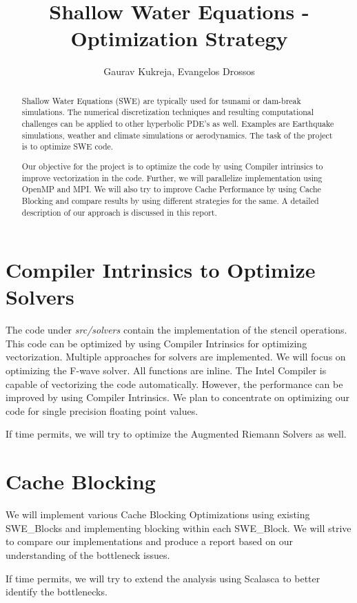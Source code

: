 \documentclass[]{article}
\title{Shallow Water Equations - Optimization Strategy}
\author{Gaurav Kukreja, Evangelos Drossos}
\begin{document}
\maketitle

\begin{abstract}
Shallow Water Equations (SWE) are typically used for tsunami or dam-break simulations.
The numerical discretization techniques and resulting computational challenges can be
applied to other hyperbolic PDE's as well. Examples are Earthquake simulations,
weather and climate simulations or aerodynamics. The task of the project is to optimize
SWE code. 

Our objective for the project is to optimize the code by using Compiler intrinsics to
improve vectorization in the code. Further, we will parallelize implementation using
OpenMP and MPI. We will also try to improve Cache Performance by using Cache Blocking
and compare results by using different strategies for the same. A detailed description of
our approach is discussed in this report.
\end{abstract}

\section{Compiler Intrinsics to Optimize Solvers}
The code under \textit{src/solvers} contain the implementation of the stencil operations.
This code can be optimized by using Compiler Intrinsics for optimizing vectorization.
Multiple approaches for solvers are implemented. We will focus on optimizing the 
F-wave solver. All functions are inline. The Intel Compiler is capable of vectorizing
the code automatically. However, the performance can be improved by using Compiler
Intrinsics. We plan to concentrate on optimizing our code for single precision floating point values.

If time permits, we will try to optimize the Augmented Riemann Solvers as well.

\section{Cache Blocking}
We will implement various Cache Blocking Optimizations using existing SWE\_Blocks and
implementing blocking within each SWE\_Block. We will strive to compare our implementations and
produce a report based on our understanding of the bottleneck issues.

If time permits, we will try to extend the analysis using Scalasca to better identify
the bottlenecks.
\end{document}
